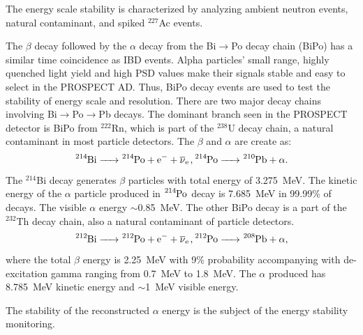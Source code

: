 
The energy scale stability is characterized by analyzing ambient neutron events, natural contaminant, and spiked $^{227}$Ac events.

The $\beta$ decay followed by the $\alpha$ decay from the Bi$\rightarrow$Po decay chain (BiPo) has a similar time coincidence as IBD events.
Alpha particles' small range, highly quenched light yield and high PSD values make their signals stable and easy to select in the PROSPECT AD. 
Thus,  BiPo decay events are used to test the stability of energy scale and resolution.
There are two major decay chains involving Bi$\rightarrow$Po$\rightarrow$Pb decays.
The dominant branch seen in the PROSPECT detector is BiPo from $^{222}$Rn, which is part of the $^{238}$U decay chain, a natural contaminant in most particle detectors. 
The $\beta$ and $\alpha$ are create as:
\begin{equation}
\ce{^{214}Bi -> ^{214}Po + e^- +  \nuebar}, \\
\ce{^{214}Po -> ^{210}Pb + \alpha}.
\end{equation}
The $^{214}$Bi decay generates $\beta$ particles with total energy of 3.275~MeV.
The kinetic energy of the $\alpha$ particle produced in $ \ce{^{214}Po}$ decay is 7.685~MeV in 99.99\% of decays.
The visible $\alpha$ energy $\sim$0.85~MeV.
The other BiPo decay is a part of the $^{232}$Th decay chain, also a natural contaminant of particle detectors. 
\begin{equation}
\ce{^{212}Bi -> ^{212}Po + e^- + \nuebar}, \\
\ce{^{212}Po -> ^{208}Pb + \alpha},
\end{equation}
where the total $\beta$ energy is 2.25~MeV with 9\% probability accompanying with de-excitation gamma ranging from 0.7~MeV to 1.8~MeV.
The $\alpha$ produced has 8.785~MeV kinetic energy and $\sim$1~MeV visible energy.  

The stability of the reconstructed $\alpha$ energy is the subject of the energy stability monitoring.

